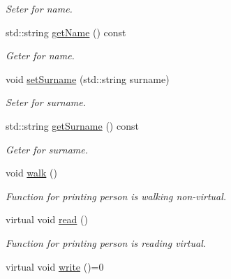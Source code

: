 \begin{DoxyCompactItemize}
\begin{DoxyCompactList}\small\item\em Seter for name. \end{DoxyCompactList}\item 
\mbox{\label{classPerson_ab20f096fdfd5201818c45754af4c3e3b}} 
std\+::string \hyperlink{classPerson_ab20f096fdfd5201818c45754af4c3e3b}{get\+Name} () const
\begin{DoxyCompactList}\small\item\em Geter for name. \end{DoxyCompactList}\item 
void \hyperlink{classPerson_af6a9ce78af39382fbab39f64319c7cde}{set\+Surname} (std\+::string surname)
\begin{DoxyCompactList}\small\item\em Seter for surname. \end{DoxyCompactList}\item 
\mbox{\label{classPerson_acc3f116651d5ff9be12268e8eef14b60}} 
std\+::string \hyperlink{classPerson_acc3f116651d5ff9be12268e8eef14b60}{get\+Surname} () const
\begin{DoxyCompactList}\small\item\em Geter for surname. \end{DoxyCompactList}\item 
\mbox{\label{classPerson_a1d4d235ad8393be84f13ef4a82fe7985}} 
void \hyperlink{classPerson_a1d4d235ad8393be84f13ef4a82fe7985}{walk} ()
\begin{DoxyCompactList}\small\item\em Function for printing person is walking non-\/virtual. \end{DoxyCompactList}\item 
\mbox{\label{classPerson_ab8a81cd224bc08f056478a4caf299ae9}} 
virtual void \hyperlink{classPerson_ab8a81cd224bc08f056478a4caf299ae9}{read} ()
\begin{DoxyCompactList}\small\item\em Function for printing person is reading virtual. \end{DoxyCompactList}\item 
\mbox{\label{classPerson_a01a1f211c8791f36ddd048a2d295fa39}} 
virtual void \hyperlink{classPerson_a01a1f211c8791f36ddd048a2d295fa39}{write} ()=0

\end{DoxyCompactItemize}

